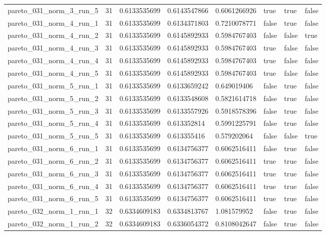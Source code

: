 \begin{tabular}{@{}llllllll@{}}
pareto\_031\_norm\_3\_run\_5 & 31 & 0.6133535699 & 0.6143547866 & 0.6061266926 & true & true & false \\
pareto\_031\_norm\_4\_run\_1 & 31 & 0.6133535699 & 0.6134371803 & 0.7210078771 & false & true & false \\
pareto\_031\_norm\_4\_run\_2 & 31 & 0.6133535699 & 0.6145892933 & 0.5984767403 & false & false & true \\
pareto\_031\_norm\_4\_run\_3 & 31 & 0.6133535699 & 0.6145892933 & 0.5984767403 & true & false & false \\
pareto\_031\_norm\_4\_run\_4 & 31 & 0.6133535699 & 0.6145892933 & 0.5984767403 & true & false & false \\
pareto\_031\_norm\_4\_run\_5 & 31 & 0.6133535699 & 0.6145892933 & 0.5984767403 & true & false & false \\
pareto\_031\_norm\_5\_run\_1 & 31 & 0.6133535699 & 0.6133659242 & 0.649019406 & false & true & false \\
pareto\_031\_norm\_5\_run\_2 & 31 & 0.6133535699 & 0.6133548608 & 0.5821614718 & false & true & false \\
pareto\_031\_norm\_5\_run\_3 & 31 & 0.6133535699 & 0.6133557926 & 0.5918578396 & false & true & false \\
pareto\_031\_norm\_5\_run\_4 & 31 & 0.6133535699 & 0.613352814 & 0.5991225791 & false & true & false \\
pareto\_031\_norm\_5\_run\_5 & 31 & 0.6133535699 & 0.613355416 & 0.579202064 & false & false & true \\
pareto\_031\_norm\_6\_run\_1 & 31 & 0.6133535699 & 0.6134756377 & 0.6062516411 & false & true & false \\
pareto\_031\_norm\_6\_run\_2 & 31 & 0.6133535699 & 0.6134756377 & 0.6062516411 & true & true & false \\
pareto\_031\_norm\_6\_run\_3 & 31 & 0.6133535699 & 0.6134756377 & 0.6062516411 & true & true & false \\
pareto\_031\_norm\_6\_run\_4 & 31 & 0.6133535699 & 0.6134756377 & 0.6062516411 & true & true & false \\
pareto\_031\_norm\_6\_run\_5 & 31 & 0.6133535699 & 0.6134756377 & 0.6062516411 & true & true & false \\
pareto\_032\_norm\_1\_run\_1 & 32 & 0.6334609183 & 0.6334813767 & 1.081579952 & false & true & false \\
pareto\_032\_norm\_1\_run\_2 & 32 & 0.6334609183 & 0.6336054372 & 0.8108042647 & false & true & false \\

\end{tabular}
